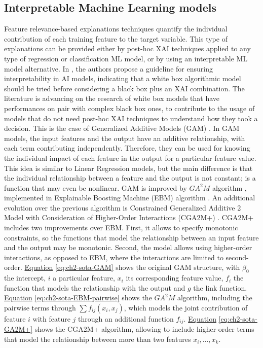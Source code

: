 \subsection{Interpretable Machine Learning models}\label{subsec:ch2-sota-interpretable-ml}
Feature relevance-based explanations techniques \parencite{molnar2019interpretable, arrieta2020explainable} quantify the individual contribution of each training feature to the target variable. This type of explanations can be provided either by post-hoc XAI techniques applied to any type of regression or classification ML model, or by using an interpretable ML model alternative. In \parencite{arrieta2020explainable}, the authors propose a guideline for ensuring interpretability in AI models, indicating that a white box algorithmic model should be tried before considering a black box plus an XAI combination. The literature is advancing on the research of white box models that have performances on pair with complex black box ones, to contribute to the usage of models that do not need post-hoc XAI techniques to understand how they took a decision. This is the case of Generalized Additive Models (GAM) \parencite{hastie1987generalized}. In GAM models, the input features and the output have an additive relationship, with each term contributing independently. Therefore, they can be used for knowing the individual impact of each feature in the output for a particular feature value. This idea is similar to Linear Regression models, but the main difference is that the individual relationship between a feature and the output is not constant; is a function that may even be nonlinear. GAM is improved by $GA^2M$ algorithm \parencite{lou2013accurate}, implemented in Explainable Boosting Machine (EBM) algorithm \parencite{nori2019interpretml}. An additional evolution over the previous algorithm is Constrained Generalized Additive 2 Model with Consideration of Higher-Order Interactions (CGA2M+) \parencite{watanabe2021cga2mplus}. CGA2M+ includes two improvements over EBM. First, it allows to specify monotonic constraints, so the functions that model the relationship between an input feature and the output may be monotonic. Second, the model allows using higher-order interactions, as opposed to EBM, where the interactions are limited to second-order. \hyperref[eq:ch2-sota-GAM]{Equation} \ref{eq:ch2-sota-GAM} shows the original GAM structure, with $\beta_0$ the intercept, $i$ a particular feature, $x_i$ its corresponding feature value, $f_i$ the function that models the relationship with the output and $g$ the link function. \hyperref[eq:ch2-sota-EBM-pairwise]{Equation} \ref{eq:ch2-sota-EBM-pairwise} shows the $GA^2M$ algorithm, including the pairwise terms through $\sum f_{ij}(x_{i}, x_{j})$, which models the joint contribution of feature $i$ with feature $j$ through an additional function $f_{ij}$.
\hyperref[eq:ch2-sota-GA2M+]{Equation} \ref{eq:ch2-sota-GA2M+} shows the CGA2M+ algorithm, allowing to include higher-order terms that model the relationship between more than two features $x_i, ..., x_k$.

